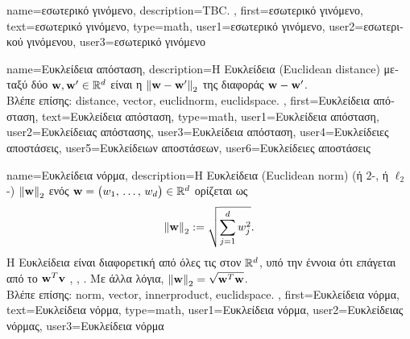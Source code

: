 {name={\foreignlanguage{greek}{εσωτερικό γινόμενο}},
	description={TBC. },
 	first={\foreignlanguage{greek}{εσωτερικό γινόμενο}},
 	text={\foreignlanguage{greek}{εσωτερικό γινόμενο}},
	type=math,
	user1={\foreignlanguage{greek}{εσωτερικό γινόμενο}}, %
    	user2={\foreignlanguage{greek}{εσωτερικού γινόμενου}}, %
	user3={\foreignlanguage{greek}{εσωτερικό γινόμενο}} %
}

{name={\foreignlanguage{greek}{Ευκλείδεια απόσταση}}, 
	description={\foreignlanguage{greek}{Η Ευκλείδεια}  
		(Euclidean distance) \foreignlanguage{greek}{μεταξύ δύο}  ${\bf w},{\bf w}' \in \mathbb{R}^{d}$
		\foreignlanguage{greek}{είναι η}  $\normgeneric{\vw-\vw'}{2}$ \foreignlanguage{greek}{της διαφοράς} ${\bf w}-{\bf w}'$.	
		\\
		\foreignlanguage{greek}{Βλέπε επίσης:} \gls{distance}, \gls{vector}, \gls{euclidnorm}, \gls{euclidspace}. },
	first={\foreignlanguage{greek}{Ευκλείδεια απόσταση}},
	text={\foreignlanguage{greek}{Ευκλείδεια απόσταση}},
	type=math,
	user1={\foreignlanguage{greek}{Ευκλείδεια απόσταση}}, %
    	user2={\foreignlanguage{greek}{Ευκλεί\-δειας απόστασης}}, %
	user3={\foreignlanguage{greek}{Ευκλείδεια απόσταση}}, %
	user4={\foreignlanguage{greek}{Ευκλείδειες αποστάσεις}}, %
    	user5={\foreignlanguage{greek}{Ευκλείδειων αποστάσεων}}, %
	user6={\foreignlanguage{greek}{Ευκλείδειες αποστάσεις}} %
}

{name={\foreignlanguage{greek}{Ευκλείδεια νόρμα}}, 
	description={\foreignlanguage{greek}{Η Ευκλείδεια}
		 (Euclidean norm) (\foreignlanguage{greek}{ή} $2$-, \foreignlanguage{greek}{ή} 
		$\ell_2$-) $\normgeneric{\weights}{2}$ \foreignlanguage{greek}{ενός}  
		${\bf w} = \big(w_{1},\,\ldots,\,w_{d} \big) \in \mathbb{R}^{d}$
		\foreignlanguage{greek}{ορίζεται ως} 
		$$\normgeneric{\weights}{2} \defeq \sqrt{\sum_{\featureidx=1}^{\nrfeatures}\weight^2_{\featureidx}}.$$ 
		\foreignlanguage{greek}{Η Ευκλείδεια}  \foreignlanguage{greek}{είναι διαφορετική από 
		όλες τις}  \foreignlanguage{greek}{στον $\mathbb{R}^{d}$, υπό την έννοια ότι 
		επάγεται από το}  ${\bf w}^{T} {\bf v}$ \cite{RudinBook}, \cite{BoydConvexBook}, \cite{HalmosFiniteDimVecSpace}. 
		\foreignlanguage{greek}{Με άλλα λόγια,} $\normgeneric{\weights}{2}= \sqrt{\weights^{T} \weights}$.	
		\\
		\foreignlanguage{greek}{Βλέπε επίσης:} \gls{norm}, \gls{vector}, \gls{innerproduct}, \gls{euclidspace}. },
	first={\foreignlanguage{greek}{Ευκλείδεια νόρμα}},
	text={\foreignlanguage{greek}{Ευκλείδεια νόρμα}},
	type=math,
	user1={\foreignlanguage{greek}{Ευκλείδεια νόρμα}}, %
  	user2={\foreignlanguage{greek}{Ευκλείδειας νόρμας}}, %
	user3={\foreignlanguage{greek}{Ευκλείδεια νόρμα}} %
}


